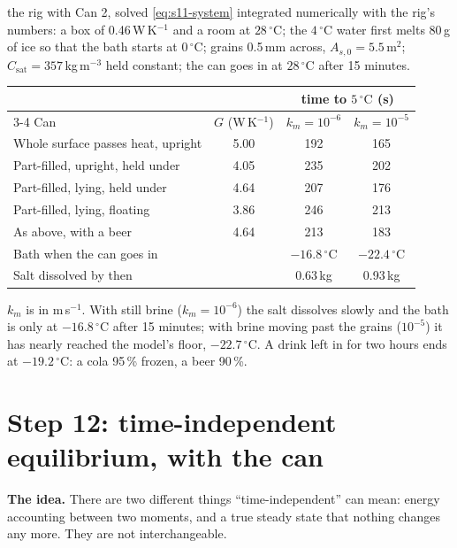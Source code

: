 \documentclass[11pt,a4paper]{article}
\newcommand{\dC}{\,{}^{\circ}\mathrm{C}}
\newcommand{\Csat}{C_{\mathrm{sat}}}
\newcommand{\para}[1]{\par\smallskip\noindent\textbf{#1}\enspace}
\begin{document}
\begin{worked}{the rig with Can 2, solved}
\eqref{eq:s11-system} integrated numerically with the rig's numbers: a box of 0.46\,W\,K$^{-1}$ and a room at
$28\dC$; the $4\dC$ water first melts 80\,g of ice so that the bath starts at $0\dC$; grains 0.5\,mm across,
$A_{s,0} = 5.5$\,m$^2$; $\Csat = 357$\,kg\,m$^{-3}$ held constant; the can goes in at $28\dC$ after 15 minutes.

\begin{center}\small
\begin{tabular}{@{}lccc@{}}
\toprule
 & & \multicolumn{2}{c}{time to $5\dC$ (s)}\\
\cmidrule(l){3-4}
Can & $G$ (W\,K$^{-1}$) & $k_m = 10^{-6}$ & $k_m = 10^{-5}$\\
\midrule
Whole surface passes heat, upright & 5.00 & 192 & 165\\
Part-filled, upright, held under & 4.05 & 235 & 202\\
Part-filled, lying, held under & 4.64 & 207 & 176\\
Part-filled, lying, floating & 3.86 & 246 & 213\\
As above, with a beer & 4.64 & 213 & 183\\
\midrule
Bath when the can goes in & & $-16.8\dC$ & $-22.4\dC$\\
Salt dissolved by then & & 0.63\,kg & 0.93\,kg\\
\bottomrule
\end{tabular}
\end{center}

\smallskip
$k_m$ is in m\,s$^{-1}$. With still brine ($k_m = 10^{-6}$) the salt dissolves slowly and the bath is only at $-16.8\dC$ after 15
minutes; with brine moving past the grains ($10^{-5}$) it has nearly reached the model's floor, $-22.7\dC$.
A drink left in for two hours ends at $-19.2\dC$: a cola 95\,\% frozen, a beer 90\,\%.
\end{worked}

\section{Step 12: time-independent equilibrium, with the can}\label{sec:s12}

\para{The idea.} There are two different things ``time-independent'' can mean: energy accounting between
two moments, and a true steady state that nothing changes any more. They are not interchangeable.
\end{document}
